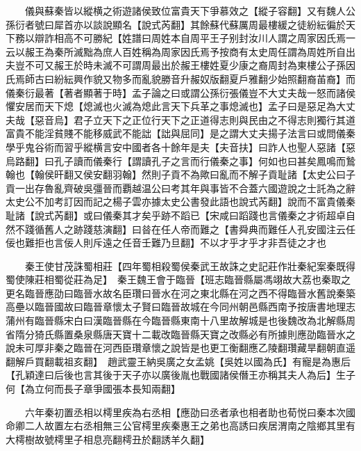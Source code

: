 　　儀與蘇秦皆以縱横之術遊諸侯致位富貴天下爭慕效之【縱子容翻】又有魏人公孫衍者號曰犀首亦以談說顯名【說式芮翻】其餘蘇代蘇厲周最樓緩之徒紛紜徧於天下務以辯詐相高不可勝紀【姓譜曰周姓本自周平王子别封汝川人謂之周家因氏焉一云以赧王為秦所滅黜為庶人百姓稱為周家因氏焉予按商有太史周任謂為周姓所自出夫豈不可又赧王於時未滅不可謂周最出於赧王樓姓夏少康之裔周封為東樓公子孫因氏焉師古曰紛紜興作貌又物多而亂貌勝音升赧奴版翻夏戶雅翻少始照翻裔苖裔】而儀秦衍最著【著者顯著于時】孟子論之曰或謂公孫衍張儀豈不大丈夫哉一怒而諸侯懼安居而天下熄【熄滅也火滅為熄此言天下兵革之事熄滅也】孟子曰是惡足為大丈夫哉【惡音烏】君子立天下之正位行天下之正道得志則與民由之不得志則獨行其道富貴不能淫貧賤不能移威武不能詘【詘與屈同】是之謂大丈夫揚子法言曰或問儀秦學乎鬼谷術而習乎縱横言安中國者各十餘年是夫【夫音扶】曰詐人也聖人惡諸【惡烏路翻】曰孔子讀而儀秦行【謂讀孔子之言而行儀秦之事】何如也曰甚矣鳳鳴而鷙翰也【翰侯旰翻又侯安翻羽翰】然則子貢不為歟曰亂而不解子貢耻諸【太史公曰子貢一出存魯亂齊破吳彊晉而覇越温公曰考其年與事皆不合蓋六國遊說之士託為之辭太史公不加考訂因而記之楊子雲亦據太史公書發此語也說式芮翻】說而不富貴儀秦耻諸【說式芮翻】或曰儀秦其才矣乎跡不蹈已【宋咸曰蹈踐也言儀秦之才術超卓自然不踐循舊人之跡踐慈演翻】曰㫺在任人帝而難之【書舜典而難任人孔安國注云任佞也難拒也言佞人則斥遠之任音壬難乃旦翻】不以才乎才乎才非吾徒之才也

　　秦王使甘茂誅蜀相莊【四年蜀相殺蜀侯秦武王故誅之史記莊作壯秦紀案秦既得蜀使陳莊相蜀從莊為足】　秦王魏王會于臨晉【班志臨晉縣屬馮翊故大荔也秦取之更名臨晉應劭曰臨晉水故名臣瓚曰晉水在河之東北縣在河之西不得臨晉水舊說秦築高壘以臨晉國故曰臨晉章懷太子賢曰臨晉故城在今同州朝邑縣西南予按唐書地理志蒲州有臨晉縣宋白曰漢臨晉縣在今臨晉縣東南十八里故解城是也後魏改為北解縣周省隋分猗氏縣置桑泉縣唐天寶十二載改臨晉縣天寶之改縣必有所據則應劭臨晉水之說未可厚非秦之臨晉在河西臣瓚章懷之說皆是也更工衡翻應乙陵翻瓚藏旱翻朝直遥翻解戶買翻載祖亥翻】　趙武靈王納吳廣之女孟姚【吳姓以國為氏】有寵是為惠后【孔穎達曰后後也言其後于天子亦以廣後胤也戰國諸侯僭王亦稱其夫人為后】生子何【為立何而長子章爭國張本長知兩翻】

　　六年秦初置丞相以樗里疾為右丞相【應劭曰丞者承也相者助也荀悦曰秦本次國命卿二人故置左右丞相無三公官樗里疾秦惠王之弟也高誘曰疾居渭南之陰鄉其里有大樗樹故號樗里子相息亮翻樗丑於翻誘羊久翻】

